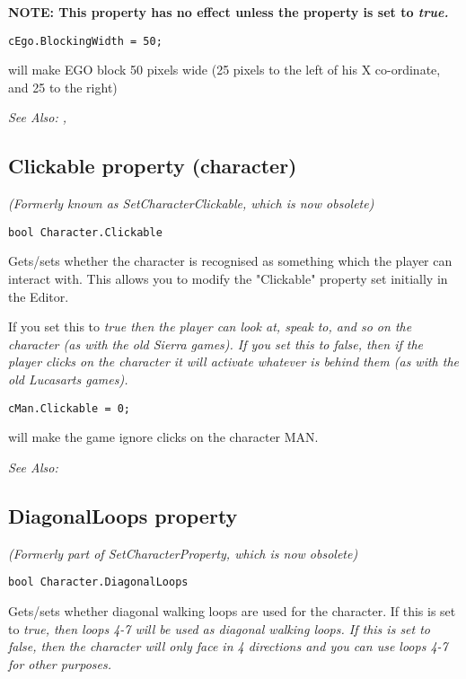\bf{NOTE:} This property has no effect unless the  property
is set to \it{true}.

\begin{verbatim}
cEgo.BlockingWidth = 50;
\end{verbatim}
will make EGO block 50 pixels wide (25 pixels to the left of his X co-ordinate, and 25 to the right)

\it{See Also:} ,


\subsection{Clickable property (character)}\label{Character.Clickable}%

\it{(Formerly known as SetCharacterClickable, which is now obsolete)}

\begin{verbatim}
bool Character.Clickable
\end{verbatim}
Gets/sets whether the character is recognised as something which the
player can interact with. This allows you to modify the "Clickable"
property set initially in the Editor.

If you set this to \it{true} then the player can look at, speak to, and so on
the character (as with the old Sierra games). If you set this to \it{false}, then
if the player clicks on the character it will activate whatever is behind
them (as with the old Lucasarts games).

\begin{verbatim}
cMan.Clickable = 0;
\end{verbatim}
will make the game ignore clicks on the character MAN.

\it{See Also:} 


\subsection{DiagonalLoops property}\label{Character.DiagonalLoops}%

\it{(Formerly part of SetCharacterProperty, which is now obsolete)}

\begin{verbatim}
bool Character.DiagonalLoops
\end{verbatim}
Gets/sets whether diagonal walking loops are used for the character. If this is set
to \it{true}, then loops 4-7 will be used as diagonal walking loops. If this is set to
\it{false}, then the character will only face in 4 directions and you can use
loops 4-7 for other purposes.

